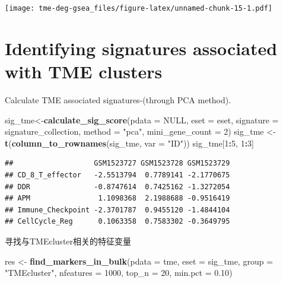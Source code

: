 \documentclass[
  12pt,
]{book}
\newenvironment{Shaded}{\begin{snugshade}}{\end{snugshade}}
\newcommand{\AttributeTok}[1]{\textcolor[rgb]{0.13,0.29,0.53}{#1}}
\newcommand{\ConstantTok}[1]{\textcolor[rgb]{0.56,0.35,0.01}{#1}}
\newcommand{\DecValTok}[1]{\textcolor[rgb]{0.00,0.00,0.81}{#1}}
\newcommand{\FloatTok}[1]{\textcolor[rgb]{0.00,0.00,0.81}{#1}}
\newcommand{\FunctionTok}[1]{\textcolor[rgb]{0.13,0.29,0.53}{\textbf{#1}}}
\newcommand{\NormalTok}[1]{#1}
\newcommand{\OtherTok}[1]{\textcolor[rgb]{0.56,0.35,0.01}{#1}}
\newcommand{\SpecialCharTok}[1]{\textcolor[rgb]{0.81,0.36,0.00}{\textbf{#1}}}
\newcommand{\StringTok}[1]{\textcolor[rgb]{0.31,0.60,0.02}{#1}}
\begin{document}
\texttt{[image: tme-deg-gsea\_files/figure-latex/unnamed-chunk-15-1.pdf]}

\hypertarget{identifying-signatures-associated-with-tme-clusters}{%
\section{Identifying signatures associated with TME clusters}\label{identifying-signatures-associated-with-tme-clusters}}

Calculate TME associated signatures-(through PCA method).

\begin{Shaded}
\begin{Highlighting}[]
\NormalTok{sig\_tme}\OtherTok{\textless{}{-}}\FunctionTok{calculate\_sig\_score}\NormalTok{(}\AttributeTok{pdata           =} \ConstantTok{NULL}\NormalTok{,}
                             \AttributeTok{eset            =}\NormalTok{ eset,}
                             \AttributeTok{signature       =}\NormalTok{ signature\_collection,}
                             \AttributeTok{method          =} \StringTok{"pca"}\NormalTok{,}
                             \AttributeTok{mini\_gene\_count =} \DecValTok{2}\NormalTok{)}
\NormalTok{sig\_tme }\OtherTok{\textless{}{-}} \FunctionTok{t}\NormalTok{(}\FunctionTok{column\_to\_rownames}\NormalTok{(sig\_tme, }\AttributeTok{var =} \StringTok{"ID"}\NormalTok{))}
\NormalTok{sig\_tme[}\DecValTok{1}\SpecialCharTok{:}\DecValTok{5}\NormalTok{, }\DecValTok{1}\SpecialCharTok{:}\DecValTok{3}\NormalTok{]}
\end{Highlighting}
\end{Shaded}

\begin{verbatim}
##                   GSM1523727 GSM1523728 GSM1523729
## CD_8_T_effector   -2.5513794  0.7789141 -2.1770675
## DDR               -0.8747614  0.7425162 -1.3272054
## APM                1.1098368  2.1988688 -0.9516419
## Immune_Checkpoint -2.3701787  0.9455120 -1.4844104
## CellCycle_Reg      0.1063358  0.7583302 -0.3649795
\end{verbatim}

寻找与TMEcluster相关的特征变量

\begin{Shaded}
\begin{Highlighting}[]
\NormalTok{res }\OtherTok{\textless{}{-}} \FunctionTok{find\_markers\_in\_bulk}\NormalTok{(}\AttributeTok{pdata =}\NormalTok{ tme, }\AttributeTok{eset =}\NormalTok{ sig\_tme, }\AttributeTok{group =} \StringTok{"TMEcluster"}\NormalTok{, }\AttributeTok{nfeatures =} \DecValTok{1000}\NormalTok{, }\AttributeTok{top\_n =} \DecValTok{20}\NormalTok{, }\AttributeTok{min.pct =} \FloatTok{0.10}\NormalTok{)}
\end{Highlighting}
\end{Shaded}
\end{document}
